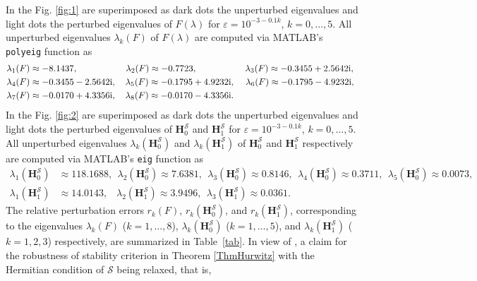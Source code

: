 \documentclass[12pt,reqno]{amsart}
\theoremstyle{plain}
\numberwithin{equation}{section}
\theoremstyle{remark}
\begin{document}
In the Fig. \ref{fig:1} are superimposed as dark dots the unperturbed eigenvalues and light dots the perturbed eigenvalues of $F(\lambda)$ for $\varepsilon=10^{-3-0.1k}$, $k=0,\ldots,5$. All unperturbed eigenvalues $\lambda_k(F)$ of $F(\lambda)$ are computed via MATLAB's \texttt{polyeig} function as
\begin{align*}
\lambda_1(F) &\approx -8.1437,\quad \quad \quad \quad \ \ \  \
\lambda_2(F) \approx -0.7723,\quad \quad \quad \quad \ \ \  \
\lambda_3(F)\approx -0.3455 + 2.5642{\rm i}, \\
\lambda_4(F) & \approx -0.3455 - 2.5642{\rm i},\ \ \ 
\lambda_5(F)  \approx -0.1795 + 4.9232{\rm i},\ \ \ \,
\lambda_6(F) \approx -0.1795 - 4.9232{\rm i},\ \ 
\\
\lambda_7(F) &\approx -0.0170 + 4.3356{\rm i}, \ \ \ 
\lambda_8(F) \approx -0.0170 - 4.3356{\rm i}. 
\end{align*}
   In the Fig. \ref{fig:2} are  superimposed as dark dots the unperturbed eigenvalues and light dots the perturbed eigenvalues of $ \mathbf{H}_{0}^{\mathscr S}$ and $ \mathbf{H}_{1}^{\mathscr S}$ for $\varepsilon=10^{-3-0.1k}$, $k=0,\ldots,5$. All unperturbed eigenvalues $\lambda_k(\mathbf{H}_0^{\mathscr{S}})$ and $\lambda_k(\mathbf{H}_1^{\mathscr{S}})$ of $\mathbf{H}_0^{\mathscr{S}}$ and $\mathbf{H}_1^{\mathscr{S}}$ respectively are computed via MATLAB's \texttt{eig} function as
\begin{align*}
\lambda_1(\mathbf{H}_0^{\mathscr{S}}) &\approx 118.1688, \ \ 
\lambda_2(\mathbf{H}_0^{\mathscr{S}}) \approx 7.6381, \ \ 
\lambda_3(\mathbf{H}_0^{\mathscr{S}}) \approx 0.8146, \ \ 
\lambda_4(\mathbf{H}_0^{\mathscr{S}}) \approx 0.3711, \ \
\lambda_5(\mathbf{H}_0^{\mathscr{S}}) \approx 0.0073, \\ 
\lambda_1(\mathbf{H}_1^{\mathscr{S}}) &\approx 14.0143, \ \ \ \, 
\lambda_2(\mathbf{H}_1^{\mathscr{S}}) \approx 3.9496,  \ \  
\lambda_3(\mathbf{H}_1^{\mathscr{S}}) \approx 0.0361. 
\end{align*}
   The relative perturbation errors $ r_k({F}) $, $ r_k(\mathbf{H}_0^{\mathscr{S}}) $, and $ r_k(\mathbf{H}_1^{\mathscr{S}}) $, corresponding to the eigenvalues $ \lambda_k({F}) $ ($ k = 1, \ldots, 8 $), $ \lambda_k(\mathbf{H}_0^{\mathscr{S}}) $ ($ k = 1, \ldots, 5 $), and $ \lambda_k(\mathbf{H}_1^{\mathscr{S}}) $ ($ k = 1, 2, 3 $) respectively, are summarized in Table~\ref{tab}. 
In view of \cite[Claims 2.4--2.5]{XD}, a claim for the robustness of stability criterion in Theorem \ref{ThmHurwitz}  with the Hermitian condition of $\mathscr S$ being relaxed, that is,  
\end{document}
